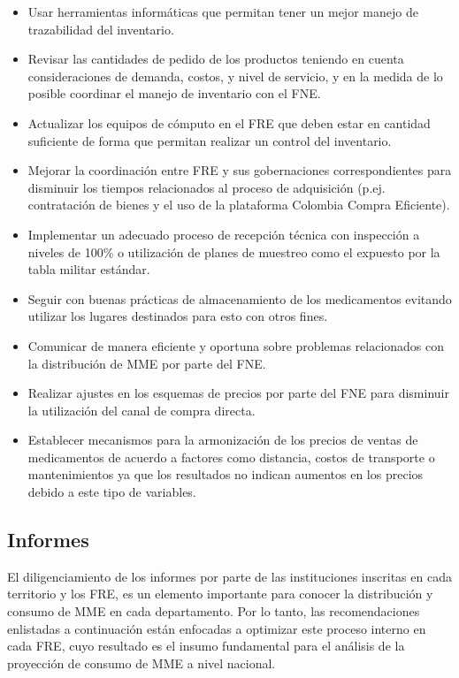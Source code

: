 \documentclass[
]{book}
\begin{document}
\begin{itemize}
\item
  Usar herramientas informáticas que permitan tener un mejor manejo de trazabilidad del inventario.
\item
  Revisar las cantidades de pedido de los productos teniendo en cuenta consideraciones de demanda, costos, y nivel de servicio, y en la medida de lo posible coordinar el manejo de inventario con el FNE.
\item
  Actualizar los equipos de cómputo en el FRE que deben estar en cantidad suficiente de forma que permitan realizar un control del inventario.
\item
  Mejorar la coordinación entre FRE y sus gobernaciones correspondientes para disminuir los tiempos relacionados al proceso de adquisición (p.ej. contratación de bienes y el uso de la plataforma Colombia Compra Eficiente).
\item
  Implementar un adecuado proceso de recepción técnica con inspección a niveles de 100\% o utilización de planes de muestreo como el expuesto por la tabla militar estándar.
\item
  Seguir con buenas prácticas de almacenamiento de los medicamentos evitando utilizar los lugares destinados para esto con otros fines.
\item
  Comunicar de manera eficiente y oportuna sobre problemas relacionados con la distribución de MME por parte del FNE.
\item
  Realizar ajustes en los esquemas de precios por parte del FNE para disminuir la utilización del canal de compra directa.
\item
  Establecer mecanismos para la armonización de los precios de ventas de medicamentos de acuerdo a factores como distancia, costos de transporte o mantenimientos ya que los resultados no indican aumentos en los precios debido a este tipo de variables.
\end{itemize}

\hypertarget{informes}{%
\subsection{Informes}\label{informes}}

El diligenciamiento de los informes por parte de las instituciones inscritas en cada territorio y los FRE, es un elemento importante para conocer la distribución y consumo de MME en cada departamento. Por lo tanto, las recomendaciones enlistadas a continuación están enfocadas a optimizar este proceso interno en cada FRE, cuyo resultado es el insumo fundamental para el análisis de la proyección de consumo de MME a nivel nacional.
\end{document}
